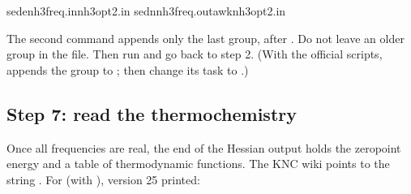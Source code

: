 \documentclass[letterpaper,10pt,english,openany,oneside]{sphinxmanual}
\begin{document}
\begin{sphinxVerbatim}[commandchars=\\\{\}]
sed\PYGZhy{}enh3\PYGZus{}freq.in\PYGZgt{}nh3\PYGZus{}opt2.in
sed\PYGZhy{}nnh3\PYGZus{}freq.outawk\PYGZgt{}\PYGZgt{}nh3\PYGZus{}opt2.in
\end{sphinxVerbatim}





\sphinxAtStartPar
The second command appends only the last  group, after . Do not leave an older  group in
the file. Then run  and go back to step 2. (With the official scripts,  appends the group
to ; then change its task to .)


\subsection{Step 7: read the thermochemistry}
\label{\detokenize{start/getting-started:step-7-read-the-thermochemistry}}\label{\detokenize{start/getting-started:qs-thermo}}
\sphinxAtStartPar
Once all frequencies are real, the end of the Hessian output holds the zero\sphinxhyphen{}point energy and a table of thermodynamic
functions. The KNC wiki points to the string . For  (with ), version 25 printed:
\end{document}
